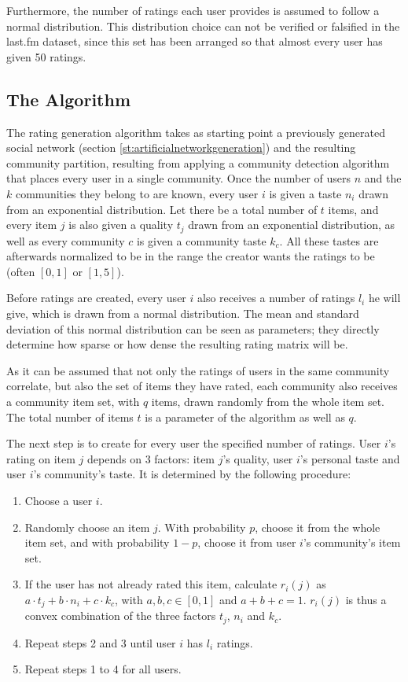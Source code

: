Furthermore, the number of ratings each user provides is assumed to follow a normal distribution. This distribution choice can not be verified or falsified in the last.fm dataset, since this set has been arranged so that almost every user has given 50 ratings.

\subsection{The Algorithm}
\label{sst:thealgorithm} The rating generation algorithm takes as starting point a previously generated social network (section \ref{st:artificialnetworkgeneration}) and the resulting community partition, resulting from applying a community detection algorithm that places every user in a single community. Once the number of users $n$ and the $k$ communities they belong to are known, every user $i$ is given a taste $n_i$ drawn from an exponential distribution. Let there be a total number of $t$ items, and every item $j$ is also given a quality $t_j$ drawn from an exponential distribution, as well as every community $c$ is given a community taste $k_c$. All these tastes are afterwards normalized to be in the range the creator wants the ratings to be (often $[0,1]$ or $[1,5]$).

Before ratings are created, every user $i$ also receives a number of ratings $l_i$ he will give, which is drawn from a normal distribution. The mean and standard deviation of this normal distribution can be seen as parameters; they directly determine how sparse or how dense the resulting rating matrix will be.

As it can be assumed that not only the ratings of users in the same community correlate, but also the set of items they have rated, each community also receives a community item set, with $q$ items, drawn randomly from the whole item set. The total number of items $t$ is a parameter of the algorithm as well as $q$. 

The next step is to create for every user the specified number of ratings. User $i$'s rating on item $j$ depends on 3 factors: item $j$'s quality, user $i$'s personal taste and user $i$'s community's taste. It is determined by the following procedure:

\begin{enumerate}
\item Choose a user $i$.
\item Randomly choose an item $j$. With probability $p$, choose it from the whole item set, and with probability $1-p$, choose it from user $i$'s community's item set.
\item If the user has not already rated this item, calculate $r_i(j)$ as $a \cdot t_j + b \cdot n_i + c \cdot k_c$, with $a,b,c \in [0,1]$ and $a+b+c=1$. $r_i(j)$ is thus a convex combination of the three factors $t_j$, $n_i$ and $k_c$.
\item Repeat steps 2 and 3 until user $i$ has $l_i$ ratings.
\item Repeat steps 1 to 4 for all users.
\end{enumerate}